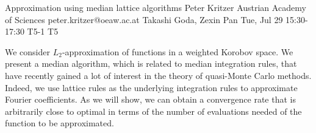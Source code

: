 \begin{talk}
  {Approximation using median lattice algorithms}%
  {Peter Kritzer}%
  {Austrian Academy of Sciences}%
  {peter.kritzer@oeaw.ac.at}%
  {Takashi Goda, Zexin Pan}%
  {}%
  {Tue, Jul 29 15:30-17:30}%
  {T5-1}%
  {T5}%
  
				
			
We consider $L_2$-approximation of functions in a weighted Korobov space. We present a median algorithm, which is related to median integration rules, that have recently gained a lot of interest in the theory of quasi-Monte Carlo methods. Indeed, we use lattice rules as the underlying integration rules to approximate Fourier coefficients. As we will show, we can obtain a convergence rate that is arbitrarily close to optimal in terms of the number of evaluations needed of the function to be approximated.
\end{talk}

